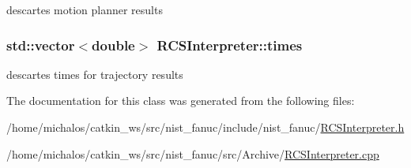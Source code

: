 descartes motion planner results \hypertarget{classRCSInterpreter_a2437a1768cfa972b39ff56c8f16ff3c1}{
\subsubsection[{times}]{\setlength{\rightskip}{0pt plus 5cm}std\-::vector$<$double$>$ R\-C\-S\-Interpreter\-::times}}\label{classRCSInterpreter_a2437a1768cfa972b39ff56c8f16ff3c1}
descartes times for trajectory results 

The documentation for this class was generated from the following files\-:\begin{DoxyCompactItemize}
\item 
/home/michalos/catkin\-\_\-ws/src/nist\-\_\-fanuc/include/nist\-\_\-fanuc/\hyperlink{RCSInterpreter_8h}{R\-C\-S\-Interpreter.\-h}\item 
/home/michalos/catkin\-\_\-ws/src/nist\-\_\-fanuc/src/\-Archive/\hyperlink{Archive_2RCSInterpreter_8cpp}{R\-C\-S\-Interpreter.\-cpp}\end{DoxyCompactItemize}
